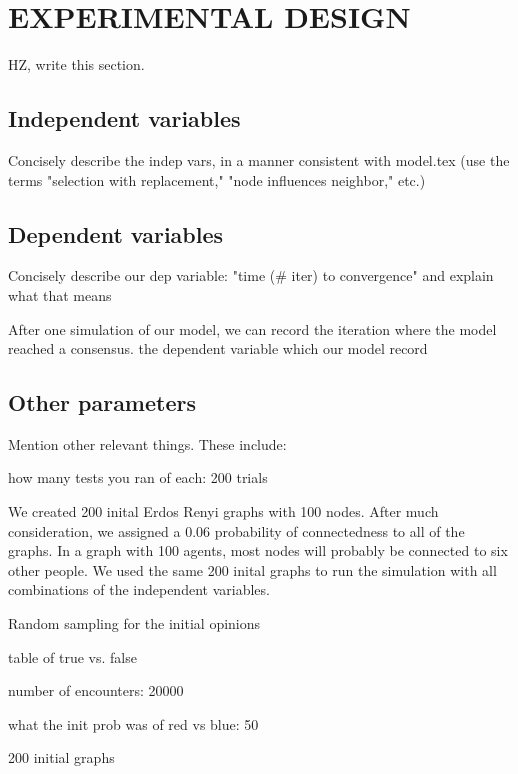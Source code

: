 
\section{EXPERIMENTAL DESIGN}

HZ, write this section.

\subsection{Independent variables}

Concisely describe the indep vars, in a manner consistent with model.tex (use
the terms "selection with replacement," "node influences neighbor," etc.)


\subsection{Dependent variables}

Concisely describe our dep variable: "time (# iter) to convergence" and
explain what that means


After one simulation of our model, we can record the iteration where the model
reached a consensus.
 the dependent variable which our model record

\subsection{Other parameters}

Mention other relevant things. These include:

how many tests you ran of each: 200 trials 

We created 200 inital Erdos Renyi graphs with 100 nodes. After much consideration,
we assigned a 0.06 probability of connectedness to all of the graphs. In a graph
with 100 agents, most nodes will probably be connected to six other people. We 
used the same 200 inital graphs to run the simulation with all combinations of
the independent variables.

Random sampling for the initial opinions 


table of true vs. false

number of encounters: 20000

what the init prob was of red vs blue: 50%



200 initial graphs



